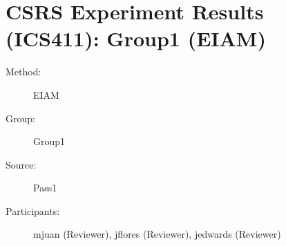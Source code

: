 \chapter {CSRS Experiment Results (ICS411): Group1 (EIAM)}
\small

\begin{description}
\item [Method:] EIAM
\item [Group:] Group1
\item [Source:] Pass1
\item [Participants:] mjuan (Reviewer), jflores (Reviewer), jedwards (Reviewer)
\end{description}
